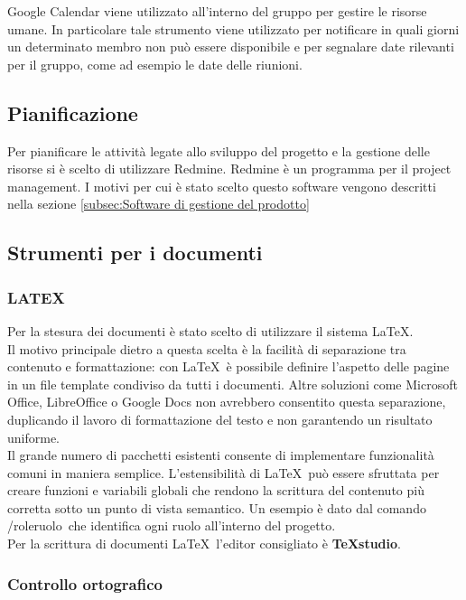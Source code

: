 Google Calendar viene utilizzato all’interno del gruppo per gestire le risorse umane. In
particolare tale strumento viene utilizzato per notificare in quali giorni un determinato
membro non può essere disponibile e per segnalare date rilevanti per il gruppo, come
ad esempio le date delle riunioni.
\subsection{Pianificazione}
\label{sec:Pianificazione}
Per pianificare le attività legate allo sviluppo del progetto e la gestione delle risorse si è scelto di utilizzare Redmine.
Redmine è un programma  per il project management. I motivi per cui è stato scelto questo software vengono descritti nella sezione \ref{subsec:Software di gestione del prodotto}

\subsection{Strumenti per i documenti}
\label{sec:strumentiDocumenti}
\subsubsection{LATEX} 
 
Per la stesura dei documenti è stato scelto di utilizzare il sistema \LaTeX.\\
Il motivo 
principale dietro a questa scelta è la facilità di separazione tra contenuto e formattazione: 
con \LaTeX\ è possibile definire l’aspetto delle pagine in un file template condiviso da tutti i documenti. Altre soluzioni come Microsoft Office, LibreOffice o Google Docs non 
avrebbero consentito questa separazione, duplicando il lavoro di formattazione del testo 
e non garantendo un risultato uniforme.\\
Il grande numero di pacchetti esistenti consente di implementare funzionalità comuni 
in maniera semplice. L’estensibilità di \LaTeX\ può essere sfruttata per creare funzioni e 
variabili globali che rendono la scrittura del contenuto più corretta sotto un punto di 
vista semantico. Un esempio è dato dal comando /role\textbraceleft ruolo\textbraceright\ che identifica ogni ruolo 
all’interno del progetto.\\
Per la scrittura di documenti \LaTeX\  l’editor consigliato è \textbf{TeXstudio}. 


\subsubsection{Controllo ortografico}


